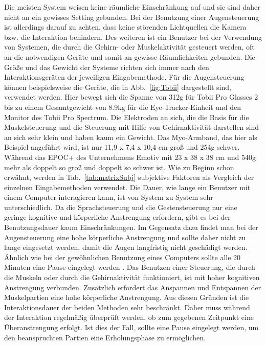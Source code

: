 \newline \newline \newline \newline \newline
Die meisten System weisen keine räumliche Einschränkung auf und sie sind daher nicht an ein gewisses Setting gebunden. Bei der Benutzung einer Augensteuerung ist allerdings darauf zu achten, dass keine störenden Lichtquellen die Kamera bzw. die Interaktion behindern. Des weiteren ist ein Benutzer bei der Verwendung von Systemen, die durch die Gehirn- oder Muskelaktivität gesteuert werden, oft an die notwendigen Geräte und somit an gewisse Räumlichkeiten gebunden.
\newline \newline
Die Größe und das Gewicht der Systeme richten sich immer nach den Interaktionsgeräten der jeweiligen Eingabemethode. Für die Augensteuerung können beispielsweise die Geräte, die in Abb.~\ref{fig:Tobii} dargestellt sind, verwendet werden. Hier bewegt sich die Spanne von 312g für Tobii Pro Glasses 2 bis zu einem Gesamtgewicht von 8.9kg für die Eye-Tracker-Einheit und den Monitor des Tobii Pro Spectrum. Die Elektroden an sich, die die Basis für die Muskelsteuerung und die Steuerung mit Hilfe von Gehirnaktivität darstellen sind an sich sehr klein und haben kaum ein Gewicht. Das Myo-Armband, das hier als Beispiel angeführt wird, ist nur 11,9 x 7,4 x 10,4 cm groß und 254g schwer. Während das EPOC+ des Unternehmens Emotiv mit 23 x 38 x 38 cm und 540g mehr als doppelt so groß und doppelt so schwer ist.
\newline \newline
Wie zu Beginn schon erwähnt, werden in Tab.~\ref{tab:matrixSubj} subjektive Faktoren als Vergleich der einzelnen Eingabemethoden verwendet.
\newline \newline
Die Dauer, wie lange ein Benutzer mit einem Computer interagieren kann, ist von System zu System sehr unterschiedlich. Da die Sprachsteuerung und die Gestensteuerung nur eine geringe kognitive und körperliche Anstrengung erfordern, gibt es bei der Benutzungsdauer kaum Einschränkungen. Im Gegensatz dazu findet man bei der Augensteuerung eine hohe körperliche Anstrengung und sollte daher nicht zu lange eingesetzt werden, damit die Augen langfristig nicht geschädigt werden. Ähnlich wie bei der gewöhnlichen Benutzung eines Computers sollte alle 20 Minuten eine Pause eingelegt werden \cite{20Methode}. Das Benutzen einer Steuerung, die durch die Muskeln oder durch die Gehirnaktivität funktioniert, ist mit hoher kognitiven Anstrengung verbunden. Zusätzlich erfordert das Anspannen und Entspannen der Muskelpartien eine hohe körperliche Anstrengung. Aus diesen Gründen ist die Interaktionsdauer der beiden Methoden sehr beschränkt. Daher muss während der Interaktion regelmäßig überprüft werden, ob zum gegebenen Zeitpunkt eine Überanstrengung erfolgt. Ist dies der Fall, sollte eine Pause eingelegt werden, um den beanspruchten Partien eine Erholungsphase zu ermöglichen.
